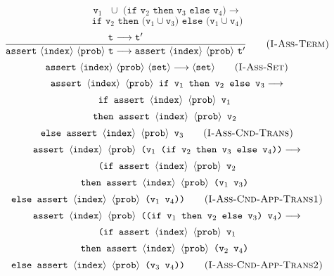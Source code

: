 \documentclass[a4paper]{article}
\begin{document}
$$
	\texttt{v$_1$ $\cup$ (if v$_2$ then v$_3$ else v$_4$)}\longrightarrow
$$
\begin{equation}
	\texttt{if v$_2$ then (v$_1$$\cup$v$_3$) else (v$_1$$\cup$v$_4$)}
	\tag{\sc I-Cnd-Union-Simp2}
\end{equation}
\begin{equation}
	\frac{\text{\tt t}_{}\longrightarrow\text{\tt t}^{\prime}_{}}
	{\text{\tt assert}\ \langle\text{\tt index}\rangle\ \langle\text{\tt prob}\rangle\ \text{\tt t}\longrightarrow\text{\tt assert}\ \langle\text{\tt index}\rangle\ \langle\text{\tt prob}\rangle\ \text{\tt t}^\prime}
	\tag{\sc I-Ass-Term}
\end{equation}
\begin{equation}
	\text{\tt assert}\ \langle\text{\tt index}\rangle\ \langle\text{\tt prob}\rangle\ \langle\text{\tt set}\rangle\longrightarrow\langle\text{\tt set}\rangle
	\tag{\sc I-Ass-Set}
\end{equation}
\pagebreak
$$
	\texttt{assert $\langle\text{\tt index}\rangle\ \langle\text{\tt prob}\rangle$ if v$_1$ then v$_2$ else v$_3$}\longrightarrow
$$
$$
	\texttt{if assert $\langle\text{\tt index}\rangle\ \langle\text{\tt prob}\rangle$ v$_1$ }
$$
$$
	\texttt{then assert $\langle\text{\tt index}\rangle\ \langle\text{\tt prob}\rangle$ v$_2$ }
$$
\begin{equation}
	\texttt{else assert $\langle\text{\tt index}\rangle\ \langle\text{\tt prob}\rangle$ v$_3$}
	\tag{\sc I-Ass-Cnd-Trans}
\end{equation}
$$
	\texttt{assert $\langle\text{\tt index}\rangle\ \langle\text{\tt prob}\rangle$ (v$_1$ (if v$_2$ then v$_3$ else v$_4$))}\longrightarrow
$$
$$
	\texttt{(if assert $\langle\text{\tt index}\rangle\ \langle\text{\tt prob}\rangle$ v$_2$}
$$
$$
	\texttt{then assert $\langle\text{\tt index}\rangle\ \langle\text{\tt prob}\rangle$ (v$_1$ v$_3$) }
$$
\begin{equation}
	\texttt{else assert $\langle\text{\tt index}\rangle\ \langle\text{\tt prob}\rangle$ (v$_1$ v$_4$))}
	\tag{\sc I-Ass-Cnd-App-Trans1}
\end{equation}
$$
	\texttt{assert $\langle\text{\tt index}\rangle\ \langle\text{\tt prob}\rangle$ ((if v$_1$ then v$_2$ else v$_3$) v$_4$)}\longrightarrow
$$
$$
	\texttt{(if assert $\langle\text{\tt index}\rangle\ \langle\text{\tt prob}\rangle$ v$_1$}
$$
$$
	\texttt{then assert $\langle\text{\tt index}\rangle\ \langle\text{\tt prob}\rangle$ (v$_2$ v$_4$) }
$$
\begin{equation}
	\texttt{else assert $\langle\text{\tt index}\rangle\ \langle\text{\tt prob}\rangle$ (v$_3$ v$_4$))}
	\tag{\sc I-Ass-Cnd-App-Trans2}
\end{equation}
\end{document}
